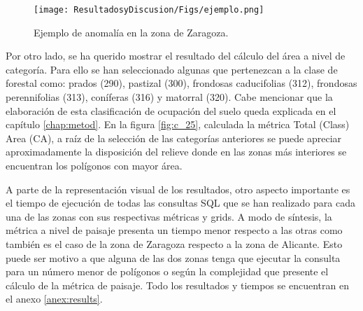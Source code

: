 \begin{figure}
\begin{center}
\texttt{[image: ResultadosyDiscusion/Figs/ejemplo.png]}
\caption{Ejemplo de anomalía en la zona de Zaragoza. \label{fig:ejemplo}}
\end{center}
\end{figure}

Por otro lado, se ha querido mostrar el resultado del cálculo del área a nivel de categoría. Para ello se han seleccionado algunas que pertenezcan a la clase de forestal como: prados (290), pastizal (300), frondosas caducifolias (312), frondosas perennifolias (313), coníferas (316) y matorral (320). Cabe mencionar que la elaboración de esta clasificación de ocupación del suelo queda explicada en el capítulo \ref{chap:metod}. En la figura \ref{fig:c_25}, calculada la métrica Total (Class) Area (CA), a raíz de la selección de las categorías anteriores se puede apreciar aproximadamente la disposición del relieve donde en las zonas más interiores se encuentran los polígonos con mayor área.

A parte de la representación visual de los resultados, otro aspecto importante es el tiempo de ejecución de todas las consultas SQL que se han realizado para cada una de las zonas con sus respectivas métricas y grids. A modo de síntesis, la métrica a nivel de paisaje presenta un tiempo menor respecto a las otras como también es el caso de la zona de Zaragoza respecto a la zona de Alicante. Esto puede ser motivo a que alguna de las dos zonas tenga que ejecutar la consulta para un número menor de polígonos o según la complejidad que presente el cálculo de la métrica de paisaje. Todo los resultados y tiempos se encuentran en el anexo \ref{anex:results}.



